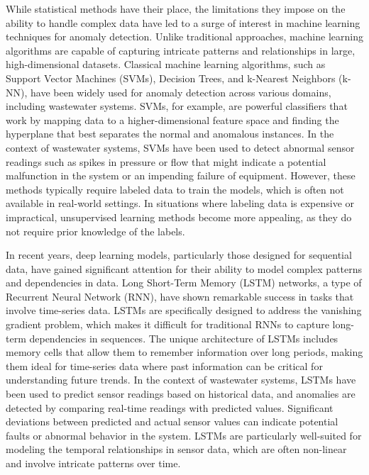\documentclass[conference]{IEEEtran}
\begin{document}
While statistical methods have their place, the limitations they impose on the ability to handle complex data have led to a surge of interest in machine learning techniques for anomaly detection. Unlike traditional approaches, machine learning algorithms are capable of capturing intricate patterns and relationships in large, high-dimensional datasets. Classical machine learning algorithms, such as Support Vector Machines (SVMs), Decision Trees, and k-Nearest Neighbors (k-NN), have been widely used for anomaly detection across various domains, including wastewater systems. SVMs, for example, are powerful classifiers that work by mapping data to a higher-dimensional feature space and finding the hyperplane that best separates the normal and anomalous instances. In the context of wastewater systems, SVMs have been used to detect abnormal sensor readings such as spikes in pressure or flow that might indicate a potential malfunction in the system or an impending failure of equipment. However, these methods typically require labeled data to train the models, which is often not available in real-world settings. In situations where labeling data is expensive or impractical, unsupervised learning methods become more appealing, as they do not require prior knowledge of the labels.

In recent years, deep learning models, particularly those designed for sequential data, have gained significant attention for their ability to model complex patterns and dependencies in data. Long Short-Term Memory (LSTM) networks, a type of Recurrent Neural Network (RNN), have shown remarkable success in tasks that involve time-series data. LSTMs are specifically designed to address the vanishing gradient problem, which makes it difficult for traditional RNNs to capture long-term dependencies in sequences. The unique architecture of LSTMs includes memory cells that allow them to remember information over long periods, making them ideal for time-series data where past information can be critical for understanding future trends. In the context of wastewater systems, LSTMs have been used to predict sensor readings based on historical data, and anomalies are detected by comparing real-time readings with predicted values. Significant deviations between predicted and actual sensor values can indicate potential faults or abnormal behavior in the system. LSTMs are particularly well-suited for modeling the temporal relationships in sensor data, which are often non-linear and involve intricate patterns over time.
\end{document}
